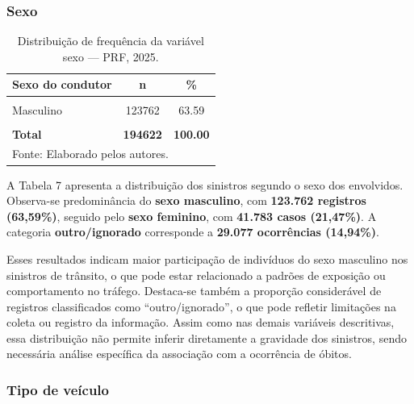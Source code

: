\documentclass[
  brazilian,
  12pt,
]{article}
\begin{document}
\subsubsection{Sexo}\label{sexo}

\begingroup\fontsize{11}{13}\selectfont

\begin{longtable}[t]{lcc}
\caption{\label{tab:tab7}Distribuição de frequência da variável sexo — PRF, 2025.}\\
\toprule
Sexo do condutor & n & \%\\
\midrule
\cellcolor{gray!10}{Feminino} & \cellcolor{gray!10}{41783} & \cellcolor{gray!10}{21.47}\\
Masculino & 123762 & 63.59\\
\cellcolor{gray!10}{Outro / Ignorado} & \cellcolor{gray!10}{29077} & \cellcolor{gray!10}{14.94}\\
\textbf{Total} & \textbf{194622} & \textbf{100.00}\\
\bottomrule
\multicolumn{3}{l}{\rule{0pt}{1em}Fonte: Elaborado pelos autores.}\\
\end{longtable}
\endgroup{}

A Tabela 7 apresenta a distribuição dos sinistros segundo o sexo dos
envolvidos. Observa-se predominância do \textbf{sexo masculino}, com
\textbf{123.762 registros (63,59\%)}, seguido pelo \textbf{sexo
feminino}, com \textbf{41.783 casos (21,47\%)}. A categoria
\textbf{outro/ignorado} corresponde a \textbf{29.077 ocorrências
(14,94\%)}.

Esses resultados indicam maior participação de indivíduos do sexo
masculino nos sinistros de trânsito, o que pode estar relacionado a
padrões de exposição ou comportamento no tráfego. Destaca-se também a
proporção considerável de registros classificados como
``outro/ignorado'', o que pode refletir limitações na coleta ou registro
da informação. Assim como nas demais variáveis descritivas, essa
distribuição não permite inferir diretamente a gravidade dos sinistros,
sendo necessária análise específica da associação com a ocorrência de
óbitos.

\subsubsection{Tipo de veículo}\label{tipo-de-veuxedculo}

\begingroup\fontsize{11}{13}\selectfont
\end{document}
